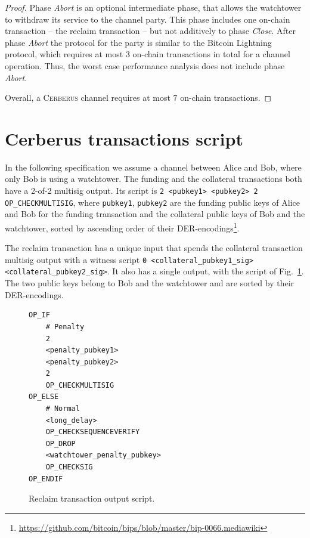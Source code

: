 \documentclass[twocolumn,showpacs,%
  nofootinbib,aps,superscriptaddress,%
  eqsecnum,prd,notitlepage,showkeys,10pt]{revtex4-1}
\newcommand{\sys}{\textsc{Cerberus}\xspace}
\begin{document}
\begin{proof}
Phase \textit{Abort} is an optional intermediate phase, that allows the watchtower to withdraw its service to the channel party. This phase includes one on-chain transaction -- the reclaim transaction -- but not additively to phase \textit{Close}. After phase \textit{Abort} the protocol for the party is similar to the Bitcoin Lightning protocol, which  requires at most $3$ on-chain transactions in total for a channel operation. Thus, the worst case performance analysis does not include phase \textit{Abort}.

Overall, a \sys channel requires at most $7$ on-chain transactions.
\end{proof}


\section{Cerberus transactions script}
\label{sec:script}

In the following specification we assume a channel between Alice and Bob, where only Bob is using a watchtower.
The funding and the collateral transactions both have a 2-of-2 multisig output. Its script is
\texttt{2 <pubkey1> <pubkey2> 2 OP\_CHECKMULTISIG},
where \texttt{pubkey1}, \texttt{pubkey2} are the funding public keys of Alice and Bob for the funding transaction and the collateral public keys of Bob and the watchtower, sorted by ascending order of their DER-encodings\footnote{\url{https://github.com/bitcoin/bips/blob/master/bip-0066.mediawiki}}.

The reclaim transaction has a unique input that spends the collateral transaction multisig output with a witness script
\texttt{0 <collateral\_pubkey1\_sig> <collateral\_pubkey2\_sig>}.
It also has a single output, with the script of Fig.~\ref{script:claim}. The two public keys belong to Bob and the watchtower and are sorted by their DER-encodings.

\begin{figure}[ht!]
    \begin{verbatim}
OP_IF
    # Penalty
    2
    <penalty_pubkey1>
    <penalty_pubkey2>
    2
    OP_CHECKMULTISIG
OP_ELSE
    # Normal
    <long_delay>
    OP_CHECKSEQUENCEVERIFY
    OP_DROP
    <watchtower_penalty_pubkey>
    OP_CHECKSIG
OP_ENDIF
    \end{verbatim}
\caption{Reclaim transaction output script.}
\label{script:claim}
\end{figure}
\end{document}
